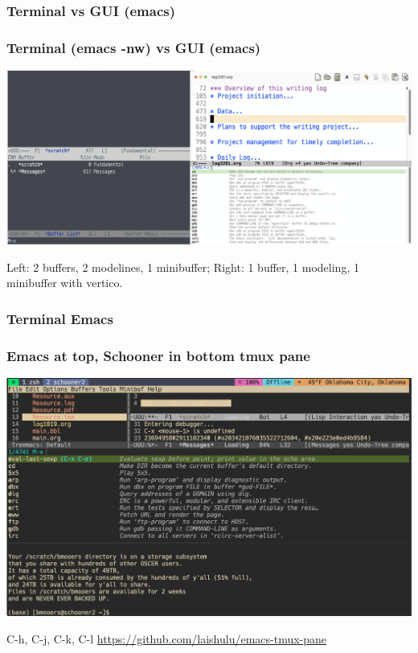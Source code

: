 \documentclass[aspectratio=169]{beamer}
\begin{document}
\subsubsection{Terminal vs GUI (emacs)}
\begin{frame}
\frametitle{Terminal (emacs -nw) vs GUI (emacs)}
\begin{center}
    \includegraphics[scale=0.43]{Figures/EmacsInterfaces.png}
\end{center}
Left: 2 buffers, 2 modelines, 1 minibuffer; Right: 1 buffer, 1 modeling, 1 minibuffer with vertico.
\end{frame}


\subsubsection{Terminal Emacs}
\begin{frame}
\frametitle{Emacs at top, Schooner in bottom tmux pane}
\begin{center}
    \includegraphics[scale=0.2]{Figures/EmacsSchooner.png}
\end{center}
C-h, C-j, C-k, C-l \url{https://github.com/laishulu/emacs-tmux-pane}
\end{frame}
\end{document}
